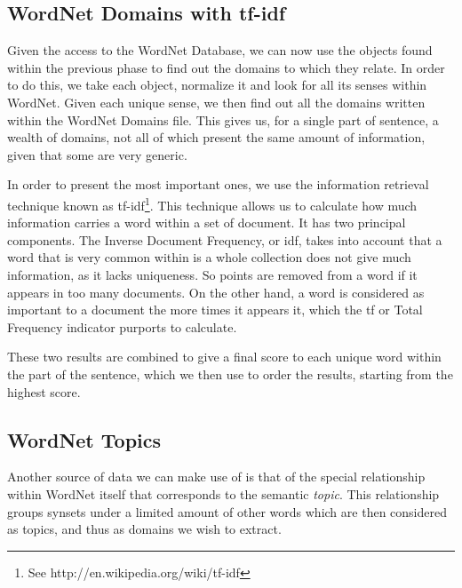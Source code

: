 
\subsection{WordNet Domains with tf-idf} %
\label{sub:wordnet_domains_with_tf_idf}

Given the access to the WordNet Database, we can now use the objects found within the previous phase to find out the domains to which they relate. In order to do this, we take each object, normalize it and look for all its senses within WordNet. Given each unique sense, we then find out all the domains written within the WordNet Domains file. This gives us, for a single part of sentence, a wealth of domains, not all of which present the same amount of information, given that some are very generic.

In order to present the most important ones, we use the information retrieval technique known as tf-idf\footnote{See http://en.wikipedia.org/wiki/tf-idf}. This technique allows us to calculate how much information carries a word within a set of document. It has two principal components. The Inverse Document Frequency, or idf, takes into account that a word that is very common within is a whole collection does not give much information, as it lacks uniqueness. So points are removed from a word if it appears in too many documents. On the other hand, a word is considered as important to a document the more times it appears it, which the tf or Total Frequency indicator purports to calculate.

These two results are combined to give a final score to each unique word within the part of the sentence, which we then use to order the results, starting from the highest score.


\subsection{WordNet Topics} %
\label{sub:wordnet_topics}

Another source of data we can make use of is that of the special relationship within WordNet itself that corresponds to the semantic \emph{topic}. This relationship groups synsets under a limited amount of other words which are then considered as topics, and thus as domains we wish to extract.



